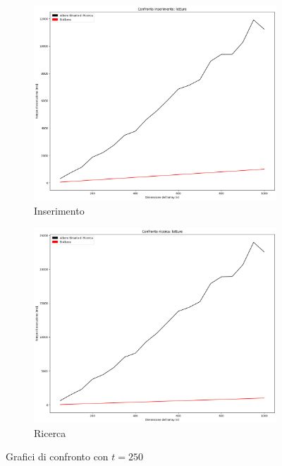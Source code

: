 \begin{figure}[H]
    \centering
    \begin{subfigure}[b]{0.49\textwidth}
        \centering
        \includegraphics[width=\textwidth]{comparison-graphs/insert-wr-t250.png}
        \caption{Inserimento}
        \label{fig:compgraphinserttimet250}
    \end{subfigure}
    \hfill
    \begin{subfigure}[b]{0.49\textwidth}
        \centering
        \includegraphics[width=\textwidth]{comparison-graphs/search-wr-t250.png}
        \caption{Ricerca}
        \label{fig:compgraphsearchtimet250}
    \end{subfigure}
    \caption{Grafici di confronto con $t=250$}
    \label{fig:compgraphtimest250}
\end{figure}

